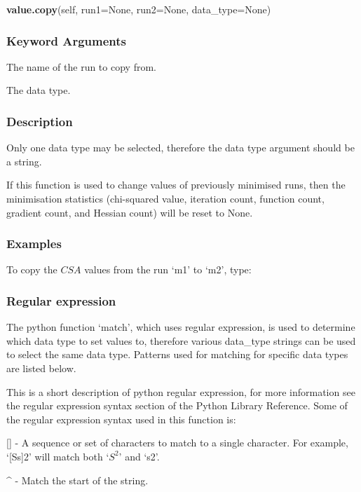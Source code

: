 \textsf{\textbf{value.copy}(self, run1=None, run2=None, data\_type=None)}


\subsubsection{Keyword Arguments}

  The name of the run to copy from.

  The data type.

\subsubsection{Description}

Only one data type may be selected, therefore the data type argument should be a string.

If this function is used to change values of previously minimised runs, then the
minimisation statistics (chi-squared value, iteration count, function count, gradient count,
and Hessian count) will be reset to None.


\subsubsection{Examples}

To copy the $CSA$ values from the run `m1' to `m2', type:




\subsubsection{Regular expression}

The python function `match', which uses regular expression, is used to determine which data
type to set values to, therefore various data\_type strings can be used to select the same
data type.  Patterns used for matching for specific data types are listed below.

This is a short description of python regular expression, for more information see the
regular expression syntax section of the Python Library Reference.  Some of the regular
expression syntax used in this function is:

    [] - A sequence or set of characters to match to a single character.  For example,
    `[Ss]2' will match both `$S^2$' and `s2'.

    \^{} - Match the start of the string.

